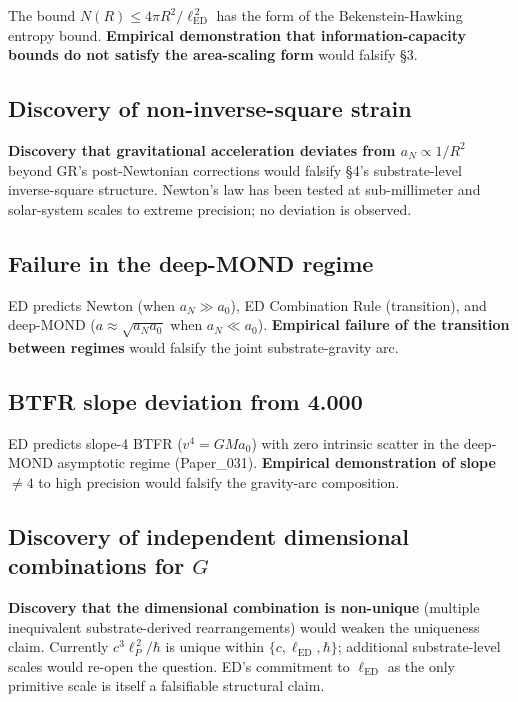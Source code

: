 \documentclass[11pt,a4paper]{article}
\begin{document}
The bound $N(R) \leq 4\pi R^2/\ell_\mathrm{ED}^{\,2}$ has the form of the Bekenstein-Hawking entropy bound. \textbf{Empirical demonstration that information-capacity bounds do not satisfy the area-scaling form} would falsify \S3.

\subsection{Discovery of non-inverse-square strain}

\textbf{Discovery that gravitational acceleration deviates from $a_N \propto 1/R^2$} beyond GR's post-Newtonian corrections would falsify \S4's substrate-level inverse-square structure. Newton's law has been tested at sub-millimeter and solar-system scales to extreme precision; no deviation is observed.

\subsection{Failure in the deep-MOND regime}

ED predicts Newton (when $a_N \gg a_0$), ED Combination Rule (transition), and deep-MOND ($a \approx \sqrt{a_N a_0}$ when $a_N \ll a_0$). \textbf{Empirical failure of the transition between regimes} would falsify the joint substrate-gravity arc.

\subsection{BTFR slope deviation from 4.000}

ED predicts slope-4 BTFR ($v^4 = GMa_0$) with zero intrinsic scatter in the deep-MOND asymptotic regime (Paper\_031). \textbf{Empirical demonstration of slope $\neq 4$} to high precision would falsify the gravity-arc composition.

\subsection{Discovery of independent dimensional combinations for $G$}

\textbf{Discovery that the dimensional combination is non-unique} (multiple inequivalent substrate-derived rearrangements) would weaken the uniqueness claim. Currently $c^3\ell_P^{\,2}/\hbar$ is unique within $\{c, \ell_\mathrm{ED}, \hbar\}$; additional substrate-level scales would re-open the question. ED's commitment to $\ell_\mathrm{ED}$ as the only primitive scale is itself a falsifiable structural claim.
\end{document}
